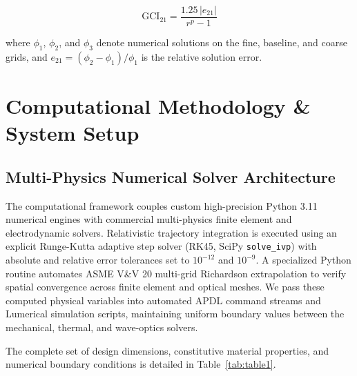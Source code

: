 \documentclass[aps,prd,reprint,superscriptaddress,nofootinbib,floatfix]{revtex4-2}
\begin{document}
\begin{equation}
\mathrm{GCI}_{21} = \frac{1.25\, |e_{21}|}{r^p - 1}
\label{eq:gci}
\end{equation}

where $\phi_1$, $\phi_2$, and $\phi_3$ denote numerical solutions on the fine, baseline, and coarse grids, and $e_{21}=(\phi_2-\phi_1)/\phi_1$ is the relative solution error.
\section{Computational Methodology \& System Setup}
\label{sec:methods}

\subsection{Multi-Physics Numerical Solver Architecture}
The computational framework couples custom high-precision Python 3.11 numerical engines with commercial multi-physics finite element and electrodynamic solvers. Relativistic trajectory integration is executed using an explicit Runge-Kutta adaptive step solver (RK45, SciPy \texttt{solve\_ivp}) with absolute and relative error tolerances set to $10^{-12}$ and $10^{-9}$. A specialized Python routine automates ASME V\&V 20 multi-grid Richardson extrapolation to verify spatial convergence across finite element and optical meshes. We pass these computed physical variables into automated APDL command streams and Lumerical simulation scripts, maintaining uniform boundary values between the mechanical, thermal, and wave-optics solvers.

The complete set of design dimensions, constitutive material properties, and numerical boundary conditions is detailed in Table~\ref{tab:table1}.
\end{document}
